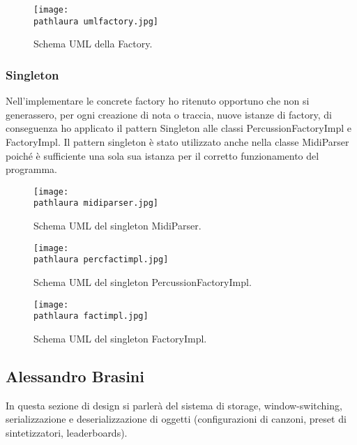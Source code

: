 \documentclass[a4paper,12pt]{report}
\newcommand\pathlaura{img/laura/}
\begin{document}
\begin{figure}[!htb]
	\centerline{\texttt{[image: \\pathlaura umlfactory.jpg]}}
	\caption{Schema UML della Factory.}
	\label{img:midifactory}
\end{figure}
\hfill\break\break\break\break\break\break

\subsubsection{Singleton}
Nell'implementare le concrete factory ho ritenuto opportuno che non si generassero, per ogni creazione di nota o traccia, nuove istanze di factory, di conseguenza ho applicato il pattern Singleton alle classi PercussionFactoryImpl e FactoryImpl. Il pattern singleton è stato utilizzato anche nella classe MidiParser poiché è sufficiente una sola sua istanza per il corretto funzionamento del programma.
\newpage

\begin{figure}[!htb]
	\centerline{\texttt{[image: \\pathlaura midiparser.jpg]}}
	\caption{Schema UML del singleton MidiParser.}
	\label{img:midiparser}
\end{figure}  
\hfill\break\break
\begin{figure}[!htb]
	\centerline{\texttt{[image: \\pathlaura percfactimpl.jpg]}}
	\caption{Schema UML del singleton PercussionFactoryImpl.}
	\label{img:percfactimpl}
\end{figure}
\hfill\break\break
\begin{figure}[!htb]
	\centerline{\texttt{[image: \\pathlaura factimpl.jpg]}}
	\caption{Schema UML del singleton FactoryImpl.}
	\label{img:factimpl}
\end{figure}
\clearpage

\subsection{Alessandro Brasini}
In questa sezione di design si parlerà del sistema di storage, window-switching, serializzazione e deserializzazione di oggetti (configurazioni di canzoni, preset di sintetizzatori, leaderboards).  
\end{document}
